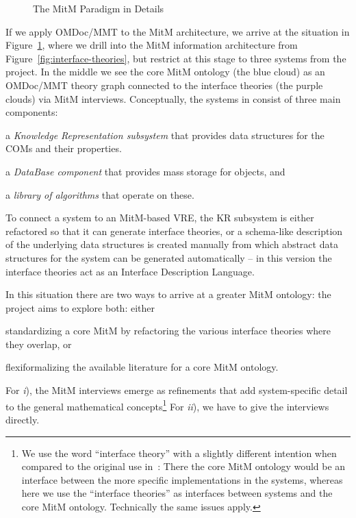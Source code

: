 
\begin{figure}[ht]\centering
  
  \caption{The MitM Paradigm in Details}\label{fig:mitm}
\end{figure}
If we apply OMDoc/MMT to the MitM architecture, we arrive at the situation in
Figure~\ref{fig:mitm}, where we drill into the MitM information architecture from
Figure~\ref{fig:interface-theories}, but restrict at this stage to three systems from the \ODK
project. In the middle we see the core MitM ontology (the blue cloud) as an OMDoc/MMT
theory graph connected to the interface theories (the purple clouds) via MitM
interviews. Conceptually, the systems in \ODK consist of three main components:
\begin{inparaenum}[\em i\rm)]
\item a \emph{Knowledge Representation subsystem} that provides data structures for the COMs and
  their properties.
\item a \emph{DataBase component} that provides mass storage for objects, and 
\item a \emph{library of algorithms} that operate on these.
\end{inparaenum}
To connect a system to an MitM-based VRE, the KR subsystem is either refactored so that it
can generate interface theories, or a schema-like description of the underlying data
structures is created manually from which abstract data structures for the system can be
generated automatically -- in this version the interface theories act as an Interface
Description Language.

In this situation there are two ways to arrive at a greater MitM ontology: the \ODK
project aims to explore both: either
\begin{inparaenum}[\em i\rm)] 
\item standardizing a core MitM by refactoring the various interface theories where they
  overlap, or
\item flexiformalizing the available literature for a core MitM ontology.
\end{inparaenum}
For \emph{i}), the MitM interviews emerge as refinements that add system-specific detail
to the general mathematical concepts\footnote{We use the word ``interface theory'' with a
  slightly different intention when compared to the original use
  in~\cite{KohRabSac:fvip11}: There the core MitM ontology would be an interface between
  the more specific implementations in the systems, whereas here we use the ``interface
  theories'' as interfaces between systems and the core MitM ontology. Technically the
  same issues apply.} For \emph{ii}), we have to give the interviews directly. 

